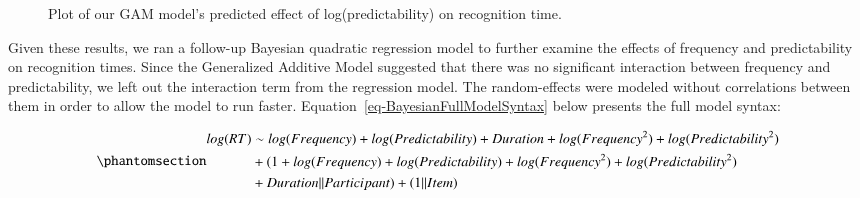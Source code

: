 \documentclass[
  authoryear,
  preprint,
  1p,
  onecolumn]{elsarticle}
\begin{document}
\begin{figure}


\caption{\label{fig-gammodelinterplot}Plot of our GAM model's predicted
effect of log(predictability) on recognition time.}

\end{figure}%

Given these results, we ran a follow-up Bayesian quadratic regression
model to further examine the effects of frequency and predictability on
recognition times. Since the Generalized Additive Model suggested that
there was no significant interaction between frequency and
predictability, we left out the interaction term from the regression
model. The random-effects were modeled without correlations between them
in order to allow the model to run faster.
Equation~\ref{eq-BayesianFullModelSyntax} below presents the full model
syntax:

\begin{equation}\phantomsection\label{eq-BayesianFullModelSyntax}{
\begin{aligned}
log(RT) & \sim  log(Frequency) + log(Predictability) + Duration + log(Frequency^2)  + log(Predictability^2) \\ & + (1 + log(Frequency) + log(Predictability) + log(Frequency^2) + log(Predictability^2) \\& + Duration || Participant) + (1 || Item)
\end{aligned}
}\end{equation}
\end{document}
